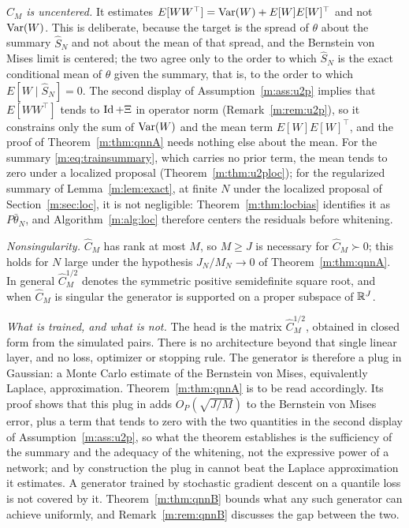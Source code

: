 \begin{definition}
\emph{$\hat C_M$ is uncentered.} It estimates $E[WW^\top]=\mathrm{Var}(W)+E[W]E[W]^\top$ and not $\mathrm{Var}(W)$. This is deliberate, because the target is the spread of $\theta$ about the summary $\hat S_N$ and not about the mean of that spread, and the Bernstein von Mises limit is centered; the two agree only to the order to which $\hat S_N$ is the exact conditional mean of $\theta$ given the summary, that is, to the order to which $E[W\mid\hat S_N]=0$. The second display of Assumption~\ref{m:ass:u2p} implies that $E[WW^\top]$ tends to $\operatorname{Id}+\Xi$ in operator norm (Remark~\ref{m:rem:u2p}), so it constrains only the sum of $\mathrm{Var}(W)$ and the mean term $E[W]E[W]^\top$, and the proof of Theorem~\ref{m:thm:qnnA} needs nothing else about the mean. For the summary \eqref{m:eq:trainsummary}, which carries no prior term, the mean tends to zero under a localized proposal (Theorem~\ref{m:thm:u2ploc}); for the regularized summary of Lemma~\ref{m:lem:exact}, at finite $N$ under the localized proposal of Section~\ref{m:sec:loc}, it is not negligible: Theorem~\ref{m:thm:locbias} identifies it as $P\bar\theta_N$, and Algorithm~\ref{m:alg:loc} therefore centers the residuals before whitening.

\emph{Nonsingularity.} $\hat C_M$ has rank at most $M$, so $M\ge J$ is necessary for $\hat C_M\succ0$; this holds for $N$ large under the hypothesis $J_N/M_N\to0$ of Theorem~\ref{m:thm:qnnA}. In general $\hat C_M^{1/2}$ denotes the symmetric positive semidefinite square root, and when $\hat C_M$ is singular the generator is supported on a proper subspace of $\mathbb{R}^J$.

\emph{What is trained, and what is not.} The head is the matrix $\hat C_M^{1/2}$, obtained in closed form from the simulated pairs. There is no architecture beyond that single linear layer, and no loss, optimizer or stopping rule. The generator is therefore a plug in Gaussian: a Monte Carlo estimate of the Bernstein von Mises, equivalently Laplace, approximation. Theorem~\ref{m:thm:qnnA} is to be read accordingly. Its proof shows that this plug in adds $O_P(\sqrt{J/M})$ to the Bernstein von Mises error, plus a term that tends to zero with the two quantities in the second display of Assumption~\ref{m:ass:u2p}, so what the theorem establishes is the sufficiency of the summary and the adequacy of the whitening, not the expressive power of a network; and by construction the plug in cannot beat the Laplace approximation it estimates. A generator trained by stochastic gradient descent on a quantile loss is not covered by it. Theorem~\ref{m:thm:qnnB} bounds what any such generator can achieve uniformly, and Remark~\ref{m:rem:qnnB} discusses the gap between the two.
\end{definition}

